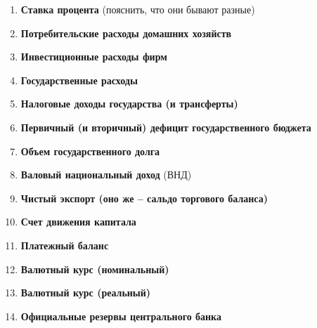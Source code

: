 \documentclass[12pt,a4paper]{article}
\begin{document}
\begin{enumerate}
\item \textbf{Ставка процента}  (пояснить, что они бывают разные)
\item \textbf{Потребительские расходы домашних хозяйств}
\item \textbf{Инвестиционные расходы фирм}
\item \textbf{Государственные расходы}
\item \textbf{Налоговые доходы государства (и трансферты)}
\item \textbf{Первичный (и вторичный) дефицит государственного бюджета}
\item \textbf{Объем государственного долга}
\item \textbf{Валовый национальный доход} (ВНД)
\item \textbf{Чистый экспорт (оно же – сальдо торгового баланса)}
\item \textbf{Счет движения капитала}
\item \textbf{Платежный баланс}
\item \textbf{Валютный курс (номинальный)}
\item \textbf{Валютный курс (реальный)}
\item \textbf{Официальные резервы центрального банка}
\end{enumerate}
\end{document}
